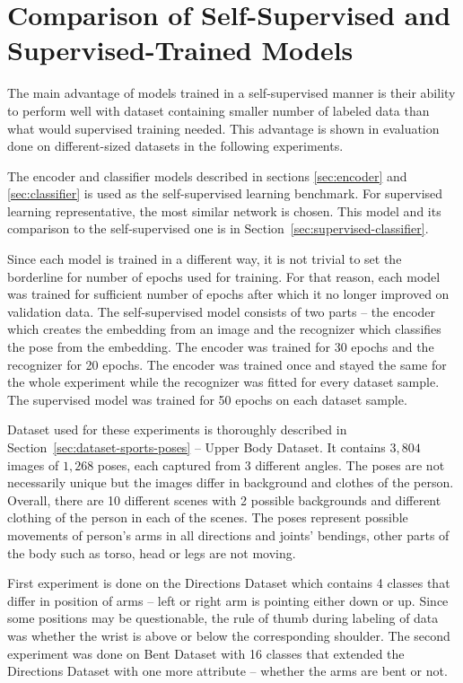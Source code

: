\section{\label{sec:evaluation-comparison}Comparison of Self-Supervised and Supervised-Trained Models}

The main advantage of models trained in a self-supervised manner is their ability to perform well with dataset containing smaller number of labeled data than what would supervised training needed. This advantage is shown in evaluation done on different-sized datasets in the following experiments.

The encoder and classifier models described in sections \ref{sec:encoder} and \ref{sec:classifier} is used as the self-supervised learning benchmark. For supervised learning representative, the most similar network is chosen. This model and its comparison to the self-supervised one is in Section~\ref{sec:supervised-classifier}.

Since each model is trained in a different way, it is not trivial to set the borderline for number of epochs used for training. For that reason, each model was trained for sufficient number of epochs after which it no longer improved on validation data. The self-supervised model consists of two parts -- the encoder which creates the embedding from an image and the recognizer which classifies the pose from the embedding. The encoder was trained for 30 epochs and the recognizer for 20 epochs. The encoder was trained once and stayed the same for the whole experiment while the recognizer was fitted for every dataset sample. The supervised model was trained for 50 epochs on each dataset sample.

Dataset used for these experiments is thoroughly described in Section~\ref{sec:dataset-sports-poses} -- Upper Body Dataset. It contains $3{,}804$ images of $1{,}268$ poses, each captured from 3 different angles. The poses are not necessarily unique but the images differ in background and clothes of the person. Overall, there are 10 different scenes with 2 possible backgrounds and different clothing of the person in each of the scenes. The poses represent possible movements of person's arms in all directions and joints' bendings, other parts of the body such as torso, head or legs are not moving.

First experiment is done on the Directions Dataset which contains 4 classes that differ in position of arms -- left or right arm is pointing either down or up. Since some positions may be questionable, the rule of thumb during labeling of data was whether the wrist is above or below the corresponding shoulder. The second experiment was done on Bent Dataset with 16 classes that extended the Directions Dataset with one more attribute -- whether the arms are bent or not.

